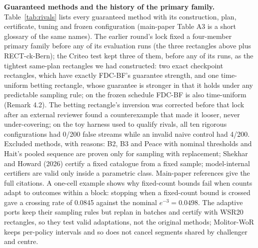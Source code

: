\documentclass[sigconf,anonymous,review]{acmart}
\begin{document}
\textbf{Guaranteed methods and the history of the primary family.} Table~\ref{tab:rivals} lists every guaranteed method with its construction, plan, certificate, tuning and frozen configuration (main-paper Table A3 is a short glossary of the same names). The earlier round's lock fixed a four-member primary family before any of its evaluation runs (the three rectangles above plus RECT-ck-Bern); the Criteo test kept three of them, before any of its runs, as the tightest same-plan rectangles we had constructed: two exact checkpoint rectangles, which have exactly FDC-BF's guarantee strength, and one time-uniform betting rectangle, whose guarantee is stronger in that it holds under any predictable sampling rule; on the frozen schedule FDC-BF is also time-uniform (Remark 4.2). The betting rectangle's inversion was corrected before that lock after an external reviewer found a counterexample that made it looser, never under-covering; on the toy harness used to qualify rivals, all ten rigorous configurations had 0/200 false streams while an invalid naive control had 4/200. Excluded methods, with reasons: B2, B3 and Peace with nominal thresholds and Hait's pooled sequence are proven only for sampling with replacement; Shekhar and Howard (2026) certify a fixed catalogue from a fixed sample; model-internal certifiers are valid only inside a parametric class. Main-paper references give the full citations. A one-cell example shows why fixed-count bounds fail when counts adapt to outcomes within a block: stopping when a fixed-count bound is crossed gave a crossing rate of 0.0845 against the nominal $e^{-3} = 0.0498$. The adaptive ports keep their sampling rules but replan in batches and certify with WSR20 rectangles, so they test valid adaptations, not the original methods; Molitor-WoR keeps per-policy intervals and so does not cancel segments shared by challenger and centre.
\end{document}
